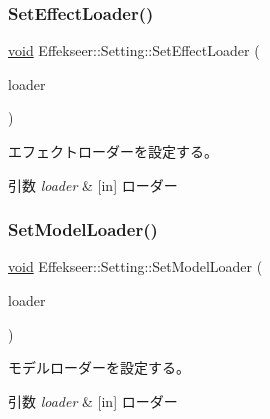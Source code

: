 \subsubsection{\texorpdfstring{Set\+Effect\+Loader()}{SetEffectLoader()}}
{\footnotesize\ttfamily \mbox{\hyperlink{namespace_effekseer_ab34c4088e512200cf4c2716f168deb56}{void}} Effekseer\+::\+Setting\+::\+Set\+Effect\+Loader (\begin{DoxyParamCaption}\item[{\mbox{\hyperlink{class_effekseer_1_1_effect_loader}{Effect\+Loader}} $\ast$}]{loader }\end{DoxyParamCaption})}



エフェクトローダーを設定する。 


\begin{DoxyParams}{引数}
{\em loader} & \mbox{[}in\mbox{]} ローダー \\
\hline
\end{DoxyParams}
\mbox{\label{class_effekseer_1_1_setting_a98982ad75809cd84b95865fc58fbd325}} 
\subsubsection{\texorpdfstring{Set\+Model\+Loader()}{SetModelLoader()}}
{\footnotesize\ttfamily \mbox{\hyperlink{namespace_effekseer_ab34c4088e512200cf4c2716f168deb56}{void}} Effekseer\+::\+Setting\+::\+Set\+Model\+Loader (\begin{DoxyParamCaption}\item[{\mbox{\hyperlink{class_effekseer_1_1_model_loader}{Model\+Loader}} $\ast$}]{loader }\end{DoxyParamCaption})}



モデルローダーを設定する。 


\begin{DoxyParams}{引数}
{\em loader} & \mbox{[}in\mbox{]} ローダー \\
\hline
\end{DoxyParams}
\mbox{\label{class_effekseer_1_1_setting_a7f383e108785141004f9ed4008ae6b20}} 
